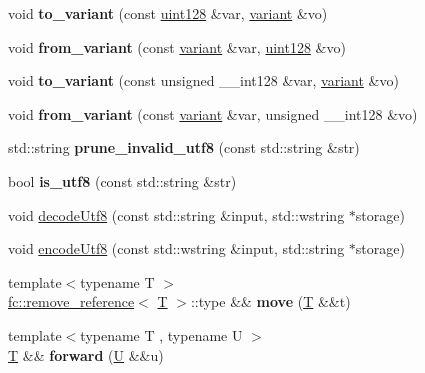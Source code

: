 \begin{DoxyCompactItemize}
void {\bfseries to\+\_\+variant} (const \mbox{\hyperlink{classfc_1_1uint128}{uint128}} \&var, \mbox{\hyperlink{classfc_1_1variant}{variant}} \&vo)
\item 
\mbox{\label{namespacefc_ab19f8cf3cfd181b14116a365a73e5ebd}} 
void {\bfseries from\+\_\+variant} (const \mbox{\hyperlink{classfc_1_1variant}{variant}} \&var, \mbox{\hyperlink{classfc_1_1uint128}{uint128}} \&vo)
\item 
\mbox{\label{namespacefc_a1cfbbddc1dffec18f728c4898bfe6757}} 
void {\bfseries to\+\_\+variant} (const unsigned \+\_\+\+\_\+int128 \&var, \mbox{\hyperlink{classfc_1_1variant}{variant}} \&vo)
\item 
\mbox{\label{namespacefc_ae1d3cdc43215d35edda6d60b0e04b424}} 
void {\bfseries from\+\_\+variant} (const \mbox{\hyperlink{classfc_1_1variant}{variant}} \&var, unsigned \+\_\+\+\_\+int128 \&vo)
\item 
\mbox{\label{namespacefc_a2e8ea7d59c206ac06ef2d1ef1c7cfb80}} 
std\+::string {\bfseries prune\+\_\+invalid\+\_\+utf8} (const std\+::string \&str)
\item 
\mbox{\label{namespacefc_aaf4d63bbbb10975bd89ddfd661733f5f}} 
bool {\bfseries is\+\_\+utf8} (const std\+::string \&str)
\item 
void \mbox{\hyperlink{namespacefc_a440b80d7907f475f1380eb76f054ed05}{decode\+Utf8}} (const std\+::string \&input, std\+::wstring $\ast$storage)
\item 
void \mbox{\hyperlink{namespacefc_a929646b3a8b7feb5688409ddef1897c9}{encode\+Utf8}} (const std\+::wstring \&input, std\+::string $\ast$storage)
\item 
\mbox{\label{namespacefc_af1a28e8a50b97884e5db83c769633f76}} 
{\footnotesize template$<$typename T $>$ }\\\mbox{\hyperlink{structfc_1_1remove__reference}{fc\+::remove\+\_\+reference}}$<$ \mbox{\hyperlink{struct_t}{T}} $>$\+::type \&\& {\bfseries move} (\mbox{\hyperlink{struct_t}{T}} \&\&t)
\item 
\mbox{\label{namespacefc_aca9ad77eca264fcb201d5a201e52478e}} 
{\footnotesize template$<$typename T , typename U $>$ }\\\mbox{\hyperlink{struct_t}{T}} \&\& {\bfseries forward} (\mbox{\hyperlink{union_u}{U}} \&\&u)

\end{DoxyCompactItemize}
